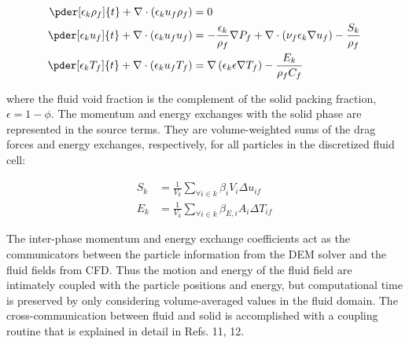 \begin{align}
\pder[\epsilon_k \rho_f]{t} + \nabla\cdot(\epsilon_k u_f \rho_f) &= 0\\
\pder[\epsilon_k u_f]{t} + \nabla\cdot(\epsilon_k u_f u_f) &= -\frac{\epsilon_k}{\rho_f}\nabla P_f + \nabla\cdot\left(\nu_f\epsilon_k\nabla u_f\right) - \frac{S_k}{\rho_f}\\
\pder[\epsilon_k T_f]{t} + \nabla\cdot(\epsilon_k u_f T_f) &= \nabla\left(\epsilon_k\epsilon\nabla T_f\right)-\frac{E_k}{\rho_fC_f}
\end{align}

where the fluid void fraction is the complement of the solid packing fraction, $\epsilon = 1 - \phi$. The momentum and energy exchanges with the solid phase are represented in the source terms. They are volume-weighted sums of the drag forces and energy exchanges, respectively, for all particles in the discretized fluid cell:

\begin{align}
S_k &= \frac{1}{V_k}\sum_{\forall i \in k} \beta_i V_i \Delta u_{if}\\
E_k &= \frac{1}{V_k}\sum_{\forall i \in k} \beta_{E,i} A_i \Delta T_{if}
\end{align}

The inter-phase momentum and energy exchange coefficients act as the communicators between the particle information from the DEM solver and the fluid fields from CFD. Thus the motion and energy of the fluid field are intimately coupled with the particle positions and energy, but computational time is preserved by only considering volume-averaged values in the fluid domain. The cross-communication between fluid and solid is accomplished with a coupling routine that is explained in detail in Refs. 11, 12.







